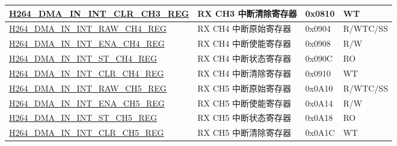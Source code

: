 \begin{longtable}{ | p{7.5cm} | p{5.7cm} | p{1.2cm} | p{1cm} | }
    \hyperref[regdesc:H264DMAININTCLRCH3REG]{H264\_DMA\_IN\_INT\_CLR\_CH3\_REG} & RX CH3 中断清除寄存器 & 0x0810 & WT \\ \hline
    \hyperref[regdesc:H264DMAININTRAWCH4REG]{H264\_DMA\_IN\_INT\_RAW\_CH4\_REG} & RX CH4 中断原始寄存器 & 0x0904 & R/WTC/SS \\ \hline
    \hyperref[regdesc:H264DMAININTENACH4REG]{H264\_DMA\_IN\_INT\_ENA\_CH4\_REG} & RX CH4 中断使能寄存器 & 0x0908 & R/W \\ \hline
    \hyperref[regdesc:H264DMAININTSTCH4REG]{H264\_DMA\_IN\_INT\_ST\_CH4\_REG} & RX CH4 中断状态寄存器 & 0x090C & RO \\ \hline
    \hyperref[regdesc:H264DMAININTCLRCH4REG]{H264\_DMA\_IN\_INT\_CLR\_CH4\_REG} & RX CH4 中断清除寄存器 & 0x0910 & WT \\ \hline
    \hyperref[regdesc:H264DMAININTRAWCH5REG]{H264\_DMA\_IN\_INT\_RAW\_CH5\_REG} & RX CH5 中断原始寄存器 & 0x0A10 & R/WTC/SS \\ \hline
    \hyperref[regdesc:H264DMAININTENACH5REG]{H264\_DMA\_IN\_INT\_ENA\_CH5\_REG} & RX CH5 中断使能寄存器 & 0x0A14 & R/W \\ \hline
    \hyperref[regdesc:H264DMAININTSTCH5REG]{H264\_DMA\_IN\_INT\_ST\_CH5\_REG} & RX CH5 中断状态寄存器 & 0x0A18 & RO \\ \hline
    \hyperref[regdesc:H264DMAININTCLRCH5REG]{H264\_DMA\_IN\_INT\_CLR\_CH5\_REG} & RX CH5 中断清除寄存器 & 0x0A1C & WT \\ \hline


\end{longtable}
